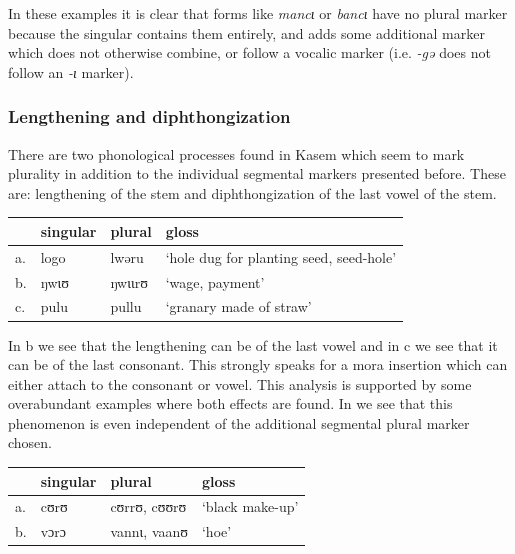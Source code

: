 In these examples it is clear that forms like \textit{mancɩ} or \textit{bancɩ} have no plural marker because the singular contains them entirely, and adds some additional marker which does not otherwise combine, or follow a vocalic marker (i.e. \textit{-gə} does not follow an \textit{-ɩ} marker).

\subsubsection{Lengthening and diphthongization}\label{sec:lengthening}

There are two phonological processes found in Kasem which seem to mark plurality in addition to the individual segmental markers presented before. These are: lengthening of the stem and diphthongization of the last vowel of the stem.

\begin{exe}
    \ex \label{dp-kasem1}
    \begin{tabular}[t]{llll}
      & singular & plural & gloss                          \\
      \midrule
      a. & logo & lwəru    & `hole dug for planting seed, seed-hole' \\
      b. & ŋwɩʊ & ŋwɩɩrʊ   & `wage, payment'                         \\
      c. & pulu & pullu    & `granary made of straw'                 \\
    \end{tabular}
\end{exe}

In b we see that the lengthening can be of the last vowel and in c we see that it can be of the last consonant. This strongly speaks for a mora insertion which can either attach to the consonant or vowel. This analysis is supported by some overabundant examples where both effects are found. In  we see that this phenomenon is even independent of the additional segmental plural marker chosen.

\begin{exe}
    \ex \label{CCVV-kasem}
    \begin{tabular}[t]{llll}
      & singular  & plural     & gloss           \\
      \midrule
      a.& cʊrʊ& cʊrrʊ, cʊʊrʊ& `black make-up'\\
      b.& vɔrɔ& vannɩ, vaanʊ& `hoe'\\
    \end{tabular}
\end{exe}

